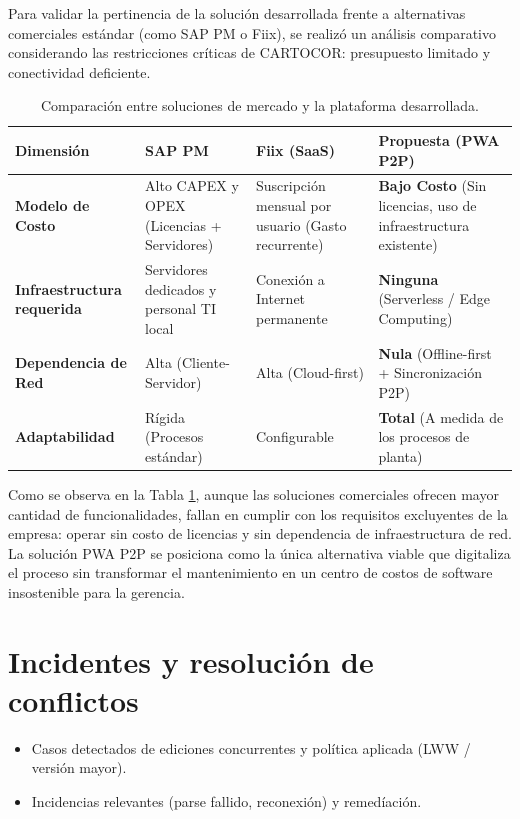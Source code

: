 \documentclass[10pt,a4paper]{report}
\begin{document}
Para validar la pertinencia de la solución desarrollada frente a alternativas comerciales estándar (como SAP PM o Fiix), se realizó un análisis comparativo considerando las restricciones críticas de CARTOCOR: presupuesto limitado y conectividad deficiente.

\begin{table}[H]
    \centering
    \begin{tabular}{p{3.5cm} p{3.5cm} p{3.5cm} p{3.5cm}}
        \hline
        \textbf{Dimensión} & \textbf{SAP PM} & \textbf{Fiix (SaaS)} & \textbf{Propuesta (PWA P2P)} \\
        \hline
        \textbf{Modelo de Costo} & Alto CAPEX y OPEX (Licencias + Servidores) & Suscripción mensual por usuario (Gasto recurrente) & \textbf{Bajo Costo} (Sin licencias, uso de infraestructura existente) \\
        \hline
        \textbf{Infraestructura requerida} & Servidores dedicados y personal TI local & Conexión a Internet permanente & \textbf{Ninguna} (Serverless / Edge Computing) \\
        \hline
        \textbf{Dependencia de Red} & Alta (Cliente-Servidor) & Alta (Cloud-first) & \textbf{Nula} (Offline-first + Sincronización P2P) \\
        \hline
        \textbf{Adaptabilidad} & Rígida (Procesos estándar) & Configurable & \textbf{Total} (A medida de los procesos de planta) \\
        \hline
    \end{tabular}
    \caption{Comparación entre soluciones de mercado y la plataforma desarrollada.}
    \label{tab:comparativa-mercado}
\end{table}

Como se observa en la Tabla \ref{tab:comparativa-mercado}, aunque las soluciones comerciales ofrecen mayor cantidad de funcionalidades, fallan en cumplir con los requisitos excluyentes de la empresa: operar sin costo de licencias y sin dependencia de infraestructura de red. La solución PWA P2P se posiciona como la única alternativa viable que digitaliza el proceso sin transformar el mantenimiento en un centro de costos de software insostenible para la gerencia.
\newpage

\section*{Incidentes y resoluci\'on de conflictos}
\begin{itemize}
    \item Casos detectados de ediciones concurrentes y pol\'itica aplicada (LWW / versi\'on mayor).
    \item Incidencias relevantes (parse fallido, reconexi\'on) y remedíaci\'on.
\end{itemize}
\end{document}
